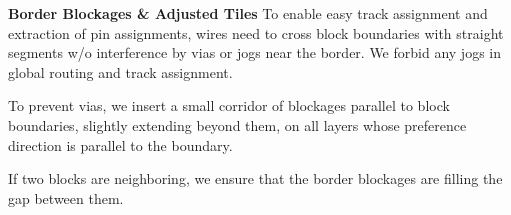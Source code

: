 \documentclass[a2paper]{bigsposter}
\begin{document}
\begin{blockrow}[3]
\begin{comment}
	

  \blocktitle{Previous work}
  Early pin assignment algorithms were based on concentric circuits \cite{koren1972pin}
  and topological models \cite{brady1984approach}.
  Later, pin assignment was combined with global routing
  \cite{cong1991pin, wang1991simultaneous, KoideWY-PinAssignmentWithGLobalRouting96, Chen+IntegratedFloorplanningAndInterconnectPlanning:1999},
  considering congestion (essentially) on the block borders using a so-called channel connection graph, and deriving
  pin positions from global routing. Among these works,  \cite{wang1991simultaneous}  allows the creation of feedthrough routes.
  An integration of pin assignment  with floorplanning for two-pin nets is considered in  \cite{pedram1990floorplanning}.
  
  Minimum-cost flow algorithms for laying out all 2-pin nets from one
  block to all others simultaneously were used \cite{xiang2003min}, also
  including buffer planning \cite{xiang2005algorithm}.
  
  According to \cite{Scheffer-IndustrialFloorplanningAndPrototyping08}, most of the above techniques are not applied in industrial floorplanning tools.
  Instead,  a rough timing-aware routing is done on a flattened netlist and pins are assigned
  where the boundaries are crossed \cite{Scheffer-IndustrialFloorplanningAndPrototyping08}.
  Boundary assertions are mostly created based on the zero slack algorithm
  \cite{nair+berman+hauge+yoffa:1989,Scheffer-IndustrialFloorplanningAndPrototyping08}.
  \blockbreak
\end{comment}
\blockbreak
 
  \textbf{Border Blockages \& Adjusted Tiles}
  \label{sec:tiles_n_border_blockages}
  To enable easy track assignment and extraction of pin assignments,  wires
  need to  cross block boundaries with straight segments  w/o interference by vias or jogs near the border.
  We forbid any jogs in global routing and track assignment.
  
 \begin{minipage}{0.5\blockwidth}
 	
 To prevent vias, we insert a small corridor of blockages parallel to
  block boundaries, slightly extending beyond them, on all layers whose preference direction is parallel
  to the boundary.
  
  If two blocks are neighboring, we ensure that the border blockages are filling the  gap between them.
  \end{minipage} 
\hfill
   \begin{minipage}{0.3\blockwidth}
   	

\end{minipage}
\end{blockrow}
\end{document}
